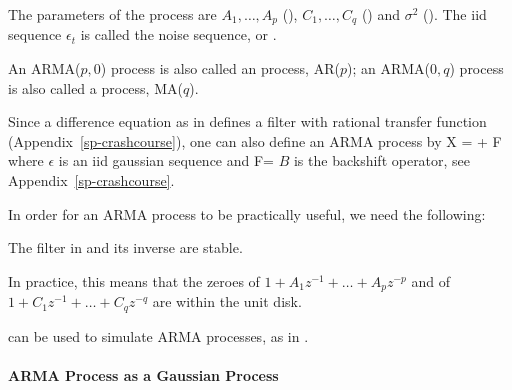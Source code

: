 The parameters of the process are $A_1,\hdots,A_p$
(), $C_1, \hdots,C_q$
() and $\sigma^2$
(). The iid sequence
$\epsilon_t$ is called the noise sequence, or
.

An ARMA($p,0$) process is also called an
 process, AR($p$); an ARMA($0,q$)
process is also called a  process,
MA($q$).

Since a difference equation as in  defines a
filter with rational transfer function
(Appendix~\ref{sp-crashcourse}), one can also define an ARMA
process by \be
 X = \mu + F \epsilon \label{eq-def-arma-filter}
 \ee
where $\epsilon$ is an iid gaussian sequence and
 \be F= 
 \label{eq-def-arma-f}
 \ee $B$ is the backshift operator, see
Appendix~\ref{sp-crashcourse}.

In order for an ARMA process to be practically useful,
we need the following:
\begin{hypo}
The filter in  and its inverse are
stable.\label{hypo-arma}
\end{hypo}
In practice, this means that the zeroes of $1+A_1
z^{-1}+\ldots + A_p z^{-p}$ and of $1+C_1z^{-1}+\ldots
+ C_q z^{-q}$ are within the unit disk.

 can be used to simulate ARMA
processes, as in .
\begin{figure}[!htbp]\begin{center}
  \end{center}
\end{figure}

\paragraph{ARMA Process as a Gaussian Process}


